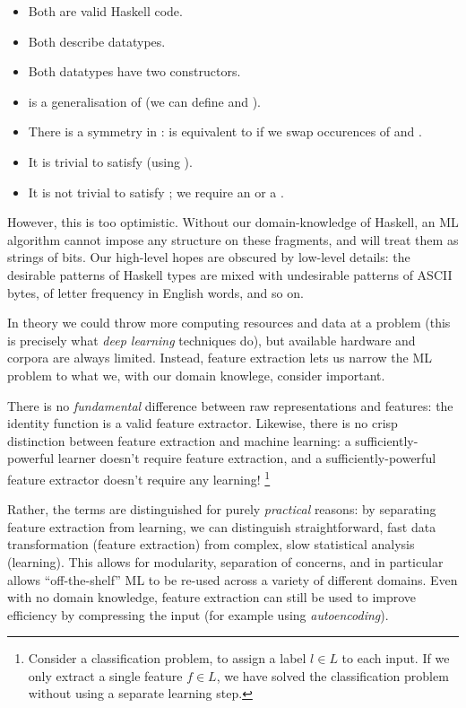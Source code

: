 \begin{itemize}
  \item Both are valid Haskell code.
  \item Both describe datatypes.
  \item Both datatypes have two constructors.
  \item {} is a generalisation of  (we can define  and ).
  \item There is a symmetry in :  is equivalent to
     if we swap occurences of  and .
  \item It is trivial to satisfy  (using ).
  \item It is not trivial to satisfy ; we require an  or a
    .
\end{itemize}

However, this is too optimistic. Without our domain-knowledge of Haskell, an ML
algorithm cannot impose any structure on these fragments, and will treat them as
strings of bits. Our high-level hopes are obscured by low-level details: the
desirable patterns of Haskell types are mixed with undesirable patterns of ASCII
bytes, of letter frequency in English words, and so on.

In theory we could throw more computing resources and data at a problem (this is
precisely what \emph{deep learning} techniques do), but available hardware and
corpora are always limited. Instead, feature extraction lets us narrow the ML
problem to what we, with our domain knowlege, consider important.

There is no \emph{fundamental} difference between raw representations and
features: the identity function is a valid feature extractor. Likewise, there is
no crisp distinction between feature extraction and machine learning: a
sufficiently-powerful learner doesn't require feature extraction, and a
sufficiently-powerful feature extractor doesn't require any learning!
\footnote{Consider a classification problem, to assign a label $l \in L$ to each
  input. If we only extract a single feature $f \in L$, we have solved the
  classification problem without using a separate learning step.}

Rather, the terms are distinguished for purely \emph{practical} reasons: by
separating feature extraction from learning, we can distinguish straightforward,
fast data transformation (feature extraction) from complex, slow statistical
analysis (learning). This allows for modularity, separation of concerns, and in
particular allows ``off-the-shelf'' ML to be re-used across a variety of
different domains. Even with no domain knowledge, feature extraction can still
be used to improve efficiency by compressing the input (for example using
\emph{autoencoding}).

